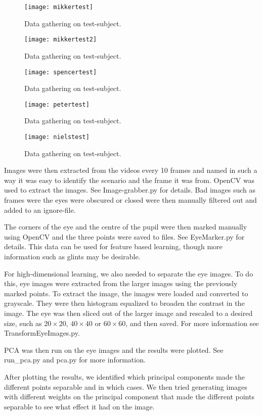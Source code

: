 \begin{figure}
\centering
\texttt{[image: mikkertest]}
\caption{Data gathering on test-subject.}
\label{fig:mikkertest}
\end{figure}

\begin{figure}
\centering
\texttt{[image: mikkertest2]}
\caption{Data gathering on test-subject.}
\label{fig:mikkertest2}
\end{figure}

\begin{figure}
\centering
\texttt{[image: spencertest]}
\caption{Data gathering on test-subject.}
\label{fig:spencertest}
\end{figure}


\begin{figure}
\centering
\texttt{[image: petertest]}
\caption{Data gathering on test-subject.}
\label{fig:petertest}
\end{figure}

\begin{figure}
\centering
\texttt{[image: nielstest]}
\caption{Data gathering on test-subject.}
\label{fig:nielstest}
\end{figure}

Images were then extracted from the videos every 10 frames and named in such a way it was easy to identify the scenario and the frame it was from. OpenCV was used to extract the images.
See Image-grabber.py for details. %
Bad images such as frames were the eyes were obscured or closed were then manually filtered out and added to an ignore-file.

The corners of the eye and the centre of the pupil were then marked manually using OpenCV and the three points were saved to files. See EyeMarker.py for details.
This data can be used for feature based learning, though more information such as glints may be desirable.  %

For high-dimensional learning, we also needed to separate the eye images.
To do this, eye images were extracted from the larger images using the previously marked points.
To extract the image, the images were loaded and converted to grayscale.
They were then histogram equalized to broaden the contrast in the image. %
The eye was then sliced out of the larger image and rescaled to a desired size, such as $20\times 20$, $40\times 40$ or $60\times 60$, and then saved.
For more information see TransformEyeImages.py. %

PCA was then run on the eye images %
and the results were plotted. See run\_pca.py and pca.py for more information. %

After plotting the results, we identified which principal components made the different points separable and in which cases.
We then tried generating images with different weights on the principal component that made the different points separable to see what effect it had on the image.